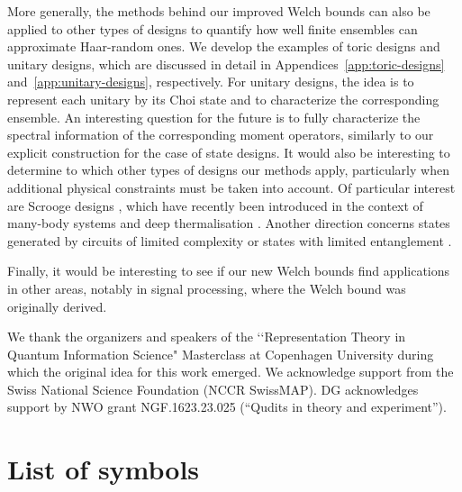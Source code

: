 \documentclass[aps,twocolumn,pra,superscriptaddress,nofootinbib]{revtex4-2}
\begin{document}
{More generally, the methods behind our improved Welch bounds can also be applied to other types of designs to quantify how well finite ensembles can approximate Haar-random ones. We develop the examples of toric designs and unitary designs, which are discussed in detail in Appendices~\ref{app:toric-designs} and~\ref{app:unitary-designs}, respectively. For unitary designs, the idea is to represent each unitary by its Choi state and to characterize the corresponding ensemble. An interesting question for the future is to fully characterize the spectral information of the corresponding moment operators, similarly to our explicit construction for the case of state designs. It would also be interesting to determine to which other types of designs our methods apply, particularly when additional physical constraints must be taken into account. Of particular interest are Scrooge designs \cite{mok2026}, which have recently been introduced in the context of many-body systems and deep thermalisation \cite{Mark2024}. Another direction concerns states generated by circuits of limited complexity \cite{Riddell} or states with limited entanglement \cite{Yu2021a,Yu2021}.

Finally, it would be interesting to see if our new Welch bounds find applications in other areas, notably in signal processing, where the Welch bound was originally derived.

}

\begin{acknowledgements}
We thank the organizers and speakers of the \lq\lq Representation Theory in Quantum Information Science" Masterclass at Copenhagen University during which the original idea for this work emerged. We acknowledge support from the Swiss National Science Foundation (NCCR SwissMAP). DG acknowledges support by NWO grant NGF.1623.23.025 (“Qudits in theory and experiment”).
\end{acknowledgements}



\newpage
\appendix
\onecolumngrid


\section{List of symbols} \label{app:symbols}
\end{document}
